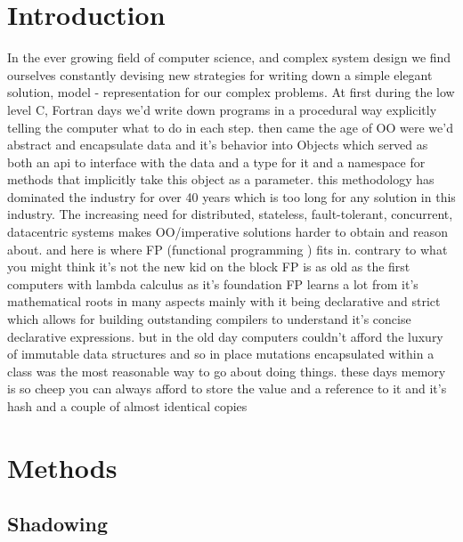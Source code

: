 \documentclass[conference]{IEEEtran}
\begin{document}
\section{Introduction}
In the ever growing field of computer science, and complex system design we find ourselves constantly devising new strategies for writing down a simple elegant solution, model - representation for our complex problems.
At first during the low level C, Fortran days we'd write down programs in a procedural way explicitly telling the computer what to do in each step.
then came the age of OO were we'd abstract and encapsulate data and it's behavior into Objects which served as both an api to interface with the data and a type for it and a namespace for methods that implicitly take this object as a parameter.
this methodology has dominated the industry for over 40 years which is too long for any solution in this industry.
The increasing need for distributed, stateless, fault-tolerant, concurrent, datacentric systems makes OO/imperative solutions harder to obtain and reason about. and here is where FP (functional programming ) fits in.
contrary to what you might think it's not the new kid on the block FP is as old as the first computers with lambda calculus as it's foundation FP learns a lot from it's mathematical roots in many aspects mainly with it being declarative and strict which allows for building outstanding compilers to understand it's concise declarative expressions. but in the old day computers couldn't afford the luxury of immutable data structures and so in place mutations encapsulated within a class was the most reasonable way to go about doing things.
these days memory is so cheep you can always afford to store the value and a reference to it and it's hash and a couple of almost identical copies

\section{Methods}

\subsection{Shadowing}
\end{document}
